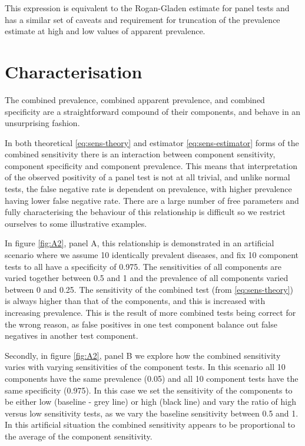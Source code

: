 \documentclass[a4paper, 12pt, twoside]{article}
\let\Oldsection\section
\renewcommand{\section}{\FloatBarrier\Oldsection}
\begin{document}
This expression is equivalent to the Rogan-Gladen estimate for panel tests and has a similar set of caveats and requirement for truncation of the prevalence estimate at high and low values of apparent prevalence.

\section{Characterisation}

The combined prevalence, combined apparent prevalence, and combined specificity are a straightforward compound of their components, and behave in an unsurprising fashion.

In both theoretical \eqref{eq:sens-theory} and estimator \eqref{eq:sens-estimator} forms of the combined sensitivity there is an interaction between component sensitivity, component specificity and component prevalence. This means that interpretation of the observed positivity of a panel test is not at all trivial, and unlike normal tests, the false negative rate is dependent on prevalence, with higher prevalence having lower false negative rate. There are a large number of free parameters and fully characterising the behaviour of this relationship is difficult so we restrict ourselves to some illustrative examples.

In figure \ref{fig:A2}, panel A, this relationship is demonstrated in an artificial scenario where we assume 10 identically prevalent diseases, and fix 10 component tests to all have a specificity of 0.975. The sensitivities of all components are varied together between 0.5 and 1 and the prevalence of all components varied between 0 and 0.25. The sensitivity of the combined test (from \eqref{eq:sens-theory}) is always higher than that of the components, and this is increased with increasing prevalence. This is the result of more combined tests being correct for the wrong reason, as false positives in one test component balance out false negatives in another test component.

Secondly, in figure \ref{fig:A2}, panel B we explore how the combined sensitivity varies with varying sensitivities of the component tests. In this scenario all 10 components have the same prevalence (0.05) and all 10 component tests have the same specificity (0.975). In this case we set the sensitivity of the components to be either low (baseline - grey line) or high (black line) and vary the ratio of high versus low sensitivity tests, as we vary the baseline sensitivity between 0.5 and 1. In this artificial situation the combined sensitivity appears to be proportional to the average of the component sensitivity.
\end{document}
